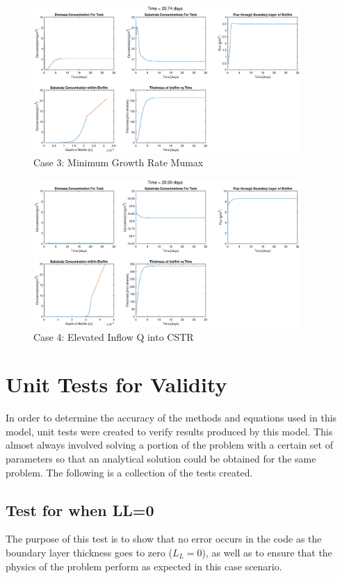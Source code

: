 \documentclass[letterpaper, twoside]{article}
\numberwithin{equation}{section}
\begin{document}
\begin{figure}[H]
  \centering
  \includegraphics[read=eps, width=4in]{Testcase3_figure.eps}
  \caption{Case 3: Minimum Growth Rate Mumax}
\end{figure}

\begin{figure}[H]
  \centering
  \includegraphics[read=eps, width=4in]{Testcase4_figure.eps}
  \caption{Case 4: Elevated Inflow Q into CSTR}
\end{figure}

\section{Unit Tests for Validity}
In order to determine the accuracy of the methods and equations used in this model, unit tests were created to verify results produced by this model. This almost always involved solving a portion of the problem with a certain set of parameters so that an analytical solution could be obtained for the same problem. The following is a collection of the tests created.

\subsection{Test for when LL=0}
The purpose of this test is to show that no error occurs in the code as the boundary layer thickness goes to zero ($L_L=0$), as well as to ensure that the physics of the problem perform as expected in this case scenario.
\end{document}
